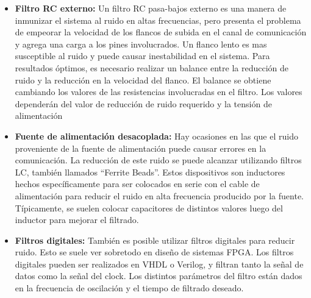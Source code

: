 \begin{itemize}
	\item \textbf{Filtro RC externo:} Un filtro RC pasa-bajos externo es una manera de inmunizar el sistema al ruido en altas frecuencias, pero presenta el problema de empeorar la velocidad de los flancos de subida en el canal de comunicación y agrega una carga a los pines involucrados. Un flanco lento es mas susceptible al ruido y puede causar inestabilidad en el sistema. Para resultados óptimos, es necesario realizar un balance entre la reducción de ruido y la reducción en la velocidad del flanco. El balance se obtiene cambiando los valores de las resistencias involucradas en el filtro. Los valores dependerán del valor de reducción de ruido requerido y la tensión de alimentación
	\item \textbf{Fuente de alimentación desacoplada:} Hay ocasiones en las que el ruido proveniente de la fuente de alimentación puede causar errores en la comunicación. La reducción de este ruido se puede alcanzar utilizando filtros LC, también llamados ``Ferrite Beads''. Estos dispositivos son inductores hechos específicamente para ser colocados en serie con el cable de alimentación para reducir el ruido en alta frecuencia producido por la fuente. Típicamente, se suelen colocar capacitores de distintos valores luego del inductor para mejorar el filtrado. 
	\item \textbf{Filtros digitales:} También es posible utilizar filtros digitales para reducir ruido. Esto se suele ver sobretodo en diseño de sistemas FPGA. Los filtros digitales pueden ser realizados en VHDL o Verilog, y filtran tanto la señal de datos como la señal del clock. Los distintos parámetros del filtro están dados en la frecuencia de oscilación y el tiempo de filtrado deseado. 
\end{itemize}



